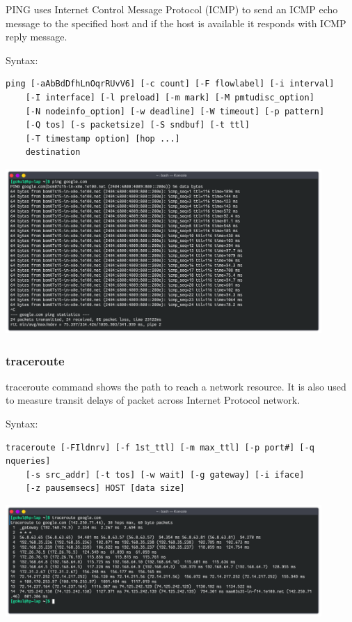 PING uses Internet Control Message Protocol (ICMP) to send an ICMP echo message
to the specified host and if the host is available it responds with ICMP reply message.
\linebreak[2]

Syntax:
\begin{lstlisting}
ping [-aAbBdDfhLnOqrRUvV6] [-c count] [-F flowlabel] [-i interval] 
	[-I interface] [-l preload] [-m mark] [-M pmtudisc_option] 
	[-N nodeinfo_option] [-w deadline] [-W timeout] [-p pattern] 
	[-Q tos] [-s packetsize] [-S sndbuf] [-t ttl] 
	[-T timestamp option] [hop ...] 
	destination
\end{lstlisting}

\begin{center}
	\includegraphics[width=0.90\textwidth]{img/p1/ss2.png}
\end{center}


\subsubsection{traceroute}
traceroute command shows the path to reach a network resource. It is also used to measure
transit delays of packet across Internet Protocol network.
\linebreak[2]

Syntax:
\begin{lstlisting}
traceroute [-FIldnrv] [-f 1st_ttl] [-m max_ttl] [-p port#] [-q nqueries]
	[-s src_addr] [-t tos] [-w wait] [-g gateway] [-i iface] 
	[-z pausemsecs] HOST [data size]
\end{lstlisting}

\begin{center}
	\includegraphics[width=0.90\textwidth]{img/p1/ss3.png}
\end{center}


